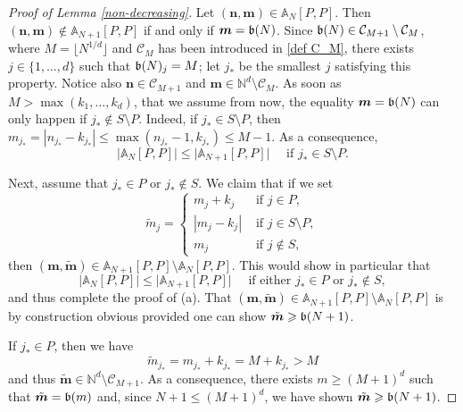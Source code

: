 \documentclass[a4paper,11pt]{article}
\numberwithin{equation}{section}
\theoremstyle{definition}
\newcommand{\eq}{\begin{equation}}
\newcommand{\qe}{\end{equation}}
\newcommand{\N}{\mathbb{N}}
\newcommand{\bs}{\boldsymbol}
\renewcommand{\leq}{\leqslant}
\renewcommand{\geq}{\geqslant}
\begin{document}
\begin{proof}[Proof of Lemma \ref{non-decreasing}]
Let $(\bs n,\bs m)\in \mathbb A_{N}[P,P]$. Then $(\bs n,\bs m)\notin \mathbb A_{N+1}[P,P]$ if and only if $\bs m = \frak b(N)$. Since  $\frak b(N)\in \mathcal C_{M+1}\setminus \mathcal C_M$, where $M=\lfloor N^{1/d}\rfloor$ and $\mathcal C_M$ has been introduced in \eqref{def C_M}, there exists $j\in\{1,\ldots,d\}$ such that $\frak b(N)_j=M$; let $j_*$ be the smallest $j$ satisfying this property. Notice also  $\bs n\in \mathcal C_{M+1}$ and $\bs m\in\mathbb N^d\setminus\mathcal C_M$. As soon as $M>\max(k_1,\ldots,k_d)$, that we assume from now, the equality $\bs m = \frak b(N)$  can only happen if $j_*\notin S\setminus P$.  Indeed, if $j_* \in S\setminus P$, then $m_{{j_*}}= |n_{{j_*}}-k_{{j_*}}|\leq  \max(n_{{j_*}}-1,k_{j_*})\leq M-1$. As a consequence,
\[
\big| \mathbb A_{N}[P,P] \big|\leq \big|\mathbb A_{N+1}[P,P] \big|\quad  \mbox{ if }  {j_*}\in S\setminus P.
 \]


 Next, assume that ${j_*} \in P$ or ${j_*}\notin S$.  We claim  that if  we set
\eq
\label{def tilde m}
 \tilde m_j=
\begin{cases} m_j+k_j & \mbox{ if } j\in P,\\
  |m_j-k_j| & \mbox{ if } j\in S\setminus P,\\
  m_j & \mbox{ if } j\notin S,
 \end{cases}
\qe
then $(\bs m,\tilde {\bs m})\in \mathbb A_{N+1}[P,P]\setminus\mathbb A_{N}[P,P]$. This  would show in particular that
\[
\big|\mathbb A_{N}[P,P] \big| \leq  \big|\mathbb A_{N+1}[P,P] \big|\quad \mbox{ if either } {j_*}\in P \mbox { or } {j_*}\notin S,
 \]
 and thus complete the proof of (a). That $(\bs m,\tilde {\bs m})\in \mathbb A_{N+1}[P,P]\setminus\mathbb A_{N}[P,P]$ is by construction obvious provided one can show  $\tilde{\bs m}\geq \frak b(N+1)$.

 If ${j_*}\in P$,  then we have
 \[
 \tilde m_{j_*}=m_{j_*}+k_{j_*}=M+k_{j_*}> M
 \]
 and thus $\tilde{\bs m}\in \N^d\setminus \mathcal C_{M+1}$. As a consequence, there exists $m\geq(M+1)^d$ such that $\tilde {\bs m}=\frak b(m)$ and, since  $N+1\leq (M+1)^d$, we have shown $\tilde{\bs m}\geq \frak b(N+1)$.


\end{proof}
\end{document}
